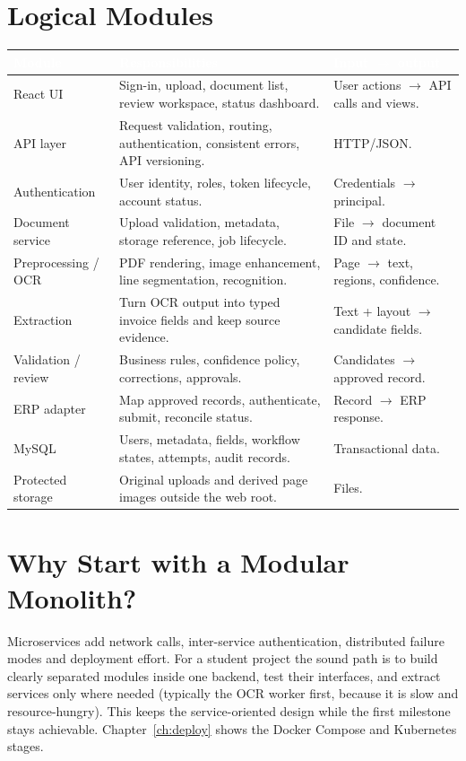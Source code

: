 \documentclass[11pt,a4paper]{report}
\newcommand{\hdr}[1]{\textcolor{white}{\sffamily\bfseries #1}}
\newcommand{\tblstart}{\rowcolors{2}{white}{rowgray}\arrayrulecolor{teal!60}}
\newcommand{\hdrrow}{\rowcolor{navy}}
\begin{document}
\section{Logical Modules}
{\tblstart\small
\begin{longtable}{L{3.0cm}L{6.2cm}L{4.7cm}}
\hdrrow \hdr{Module} & \hdr{Responsibilities} & \hdr{Input $\rightarrow$ output}\\ \endhead
React UI & Sign-in, upload, document list, review workspace, status dashboard. & User actions $\rightarrow$ API calls and views.\\
API layer & Request validation, routing, authentication, consistent errors, API versioning. & HTTP/JSON.\\
Authentication & User identity, roles, token lifecycle, account status. & Credentials $\rightarrow$ principal.\\
Document service & Upload validation, metadata, storage reference, job lifecycle. & File $\rightarrow$ document ID and state.\\
Preprocessing / OCR & PDF rendering, image enhancement, line segmentation, recognition. & Page $\rightarrow$ text, regions, confidence.\\
Extraction & Turn OCR output into typed invoice fields and keep source evidence. & Text + layout $\rightarrow$ candidate fields.\\
Validation / review & Business rules, confidence policy, corrections, approvals. & Candidates $\rightarrow$ approved record.\\
ERP adapter & Map approved records, authenticate, submit, reconcile status. & Record $\rightarrow$ ERP response.\\
MySQL & Users, metadata, fields, workflow states, attempts, audit records. & Transactional data.\\
Protected storage & Original uploads and derived page images outside the web root. & Files.\\
\hline
\end{longtable}}

\section{Why Start with a Modular Monolith?}
Microservices add network calls, inter-service authentication, distributed failure modes and deployment effort. For a student project the sound path is to build clearly separated modules inside one backend, test their interfaces, and extract services only where needed (typically the OCR worker first, because it is slow and resource-hungry). This keeps the service-oriented design while the first milestone stays achievable. Chapter~\ref{ch:deploy} shows the Docker Compose and Kubernetes stages.
\end{document}
